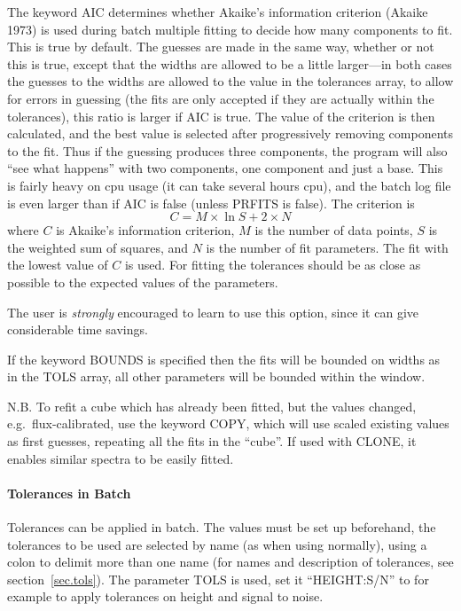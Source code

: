 The keyword AIC determines whether Akaike's information criterion
(Akaike 1973) is used during batch multiple fitting to decide how many
components to fit.
This is true by default.
The guesses are made in the same way, whether or not this is true,
except that the widths are allowed to be a little larger---in both cases
the guesses to the widths are allowed to the value in the tolerances
array, to allow for errors in guessing (the fits are only accepted if
they are actually within the tolerances), this  ratio is larger if AIC
is true.
The value of the criterion is then calculated, and the best value is
selected after progressively removing components to the fit.
Thus if the guessing produces three components, the program will also
``see what happens'' with two components, one component and just a base.
This is fairly heavy on cpu usage (it can take several hours cpu), and
the batch log file is even larger than if AIC is false (unless PRFITS is
false).
The criterion is
\[
C = M \times \ln S + 2 \times N
\]
where $C$ is Akaike's information criterion, $M$ is the number of data
points, $S$ is the weighted sum of squares, and $N$ is the number of fit
parameters.
The fit with the lowest value of $C$ is used.
For fitting the tolerances should be as close as possible to the
expected values of the parameters.

The user is {\em strongly} encouraged to learn to use this option, since
it can give considerable time savings.

If the keyword BOUNDS is specified then the fits will be bounded on
widths as in the TOLS array, all other parameters will be bounded
within the window.

N.B. To refit a cube which has already been fitted, but the values
changed, e.g.\ flux-calibrated, use the keyword COPY, which will use
scaled existing values as first guesses, repeating all the fits in the
``cube''.
If used with CLONE, it enables similar spectra to be easily fitted. 

\paragraph{Tolerances in Batch}

Tolerances can be applied in batch.
The values must be set up beforehand, the tolerances to be used are
selected by name (as when using normally), using a colon to delimit more
than one name (for names and description of tolerances, see
section~\ref{sec.tols}).
The parameter TOLS is used, set it ``HEIGHT:S/N'' to for example to
apply tolerances on height and signal to noise.

